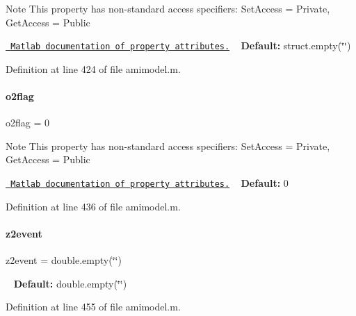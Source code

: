 \begin{DoxyNote}{Note}
This property has non-\/standard access specifiers\+: {\ttfamily Set\+Access = Private, Get\+Access = Public} 

\href{http://www.mathworks.com/help/matlab/matlab_oop/property-attributes.html}{\texttt{ Matlab documentation of property attributes.}} ~\newline
{\bfseries{Default\+:}} struct.\+empty(\char`\"{}\char`\"{}) 
\end{DoxyNote}


Definition at line 424 of file amimodel.\+m.

\mbox{\label{classamimodel_a2b89e3b4e249878a2d436ee337952c4f}} 
\paragraph{\texorpdfstring{o2flag}{o2flag}}
{\footnotesize\ttfamily o2flag = 0}

\begin{DoxyNote}{Note}
This property has non-\/standard access specifiers\+: {\ttfamily Set\+Access = Private, Get\+Access = Public} 

\href{http://www.mathworks.com/help/matlab/matlab_oop/property-attributes.html}{\texttt{ Matlab documentation of property attributes.}} ~\newline
{\bfseries{Default\+:}} 0 
\end{DoxyNote}


Definition at line 436 of file amimodel.\+m.

\mbox{\label{classamimodel_a7a7be015feeb7a346dceccd49e622b4b}} 
\paragraph{\texorpdfstring{z2event}{z2event}}
{\footnotesize\ttfamily z2event = double.\+empty(\char`\"{}\char`\"{})}

~\newline
{\bfseries{Default\+:}} double.\+empty(\char`\"{}\char`\"{}) 

Definition at line 455 of file amimodel.\+m.

\mbox{\label{classamimodel_abea45d67286ebbf35dcbc12e335ffd51}} 
